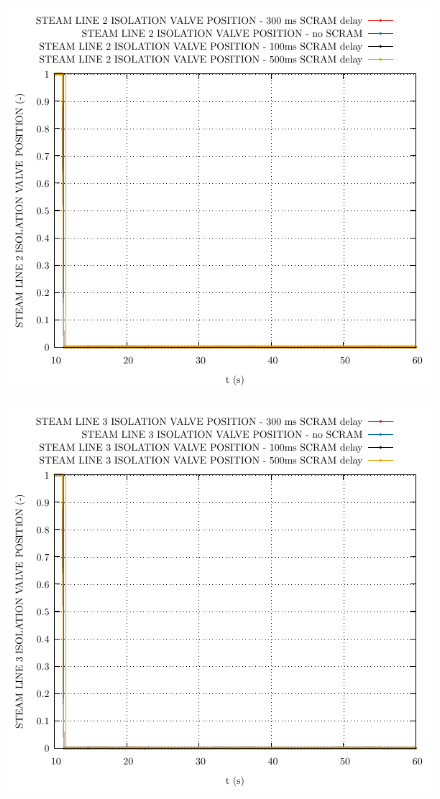 \documentclass{article}
\begin{document}
\begin{multicols}{2}
\begin{figure}[H]
\end{figure}
\begin{figure}[H]
\centering
\includegraphics[width=\columnwidth]{./graphs/STEAM LINE 2 ISOLATION VALVE POSITION_comp.pdf}
\end{figure}
\begin{figure}[H]
\centering
\includegraphics[width=\columnwidth]{./graphs/STEAM LINE 3 ISOLATION VALVE POSITION_comp.pdf}

\end{figure}
\end{multicols}
\end{document}
